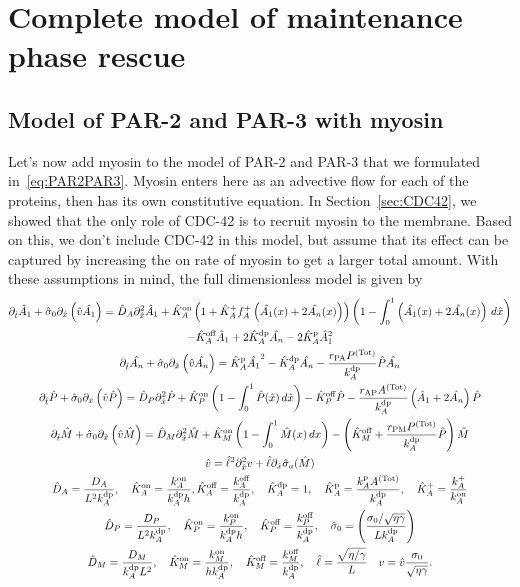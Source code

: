 \documentclass[11pt]{article}
\newcommand{\6}[1]{#1_{\text{6}}}
\newcommand{\3}[1]{#1_{\text{3}}}
\newcommand{\Tot}[1]{#1^\text{(Tot)}}
\newcommand{\A}[1]{#1_A}
\newcommand{\My}[1]{#1_M}
\begin{document}
\section{Complete model of maintenance phase rescue}

\subsection{Model of PAR-2 and PAR-3 with myosin  \label{sec:P2P3My}}
Let's now add myosin to the model of PAR-2 and PAR-3 that we formulated in\ \eqref{eq:PAR2PAR3}. Myosin enters here as an advective flow for each of the proteins, then has its own constitutive equation. In Section\ \ref{sec:CDC42}, we showed that the only role of CDC-42 is to recruit myosin to the membrane. Based on this, we don't include CDC-42 in this model, but assume that its effect can be captured by increasing the on rate of myosin to get a larger total amount. With these assumptions in mind, the full dimensionless model is given by
\begin{subequations}
\label{eq:PAR2PAR3My}
\begin{gather}
\nonumber
\Dthat \hat{A}_1 +\hat{\sigma}_0  \Dxhat \left(\hat{v} \hat{\MA} \right)   =\DhatA \Dxhat^2 \hat{A}_1 +\KhatonA\left(1+\hat{K}_A^+ f_A^+\left(\hat{\MA}(x) + 2\hat{\PA}(x)\right)\right)\left(1 - \int_0^1 \left(\hat{\MA}(x) + 2\hat{\PA}(x)\right) \, d\hat{x} \right) \\  
 -\KhatoffA \hat{A}_1 +2\KhatdpA \hat{\PA}-2 \KhatpA \hat{A}_1^2 \\ 
\Dthat \hat{\PA} +\hat{\sigma}_0  \Dxhat \left(\hat{v} \hat{\PA} \right)  =\KhatpA \hat{\MA}^2- \KhatdpA \hat{\PA}-\frac{r_\text{PA} \Tot{P}}{\kdp_A}\hat{P}\hat{\PA} \\ 
\Dthat \hat{P} +\hat{\sigma}_0  \Dxhat \left(\hat{v} \hat{P} \right)  =\DhatP \Dxhat^2 \hat{P}+\KhatonP \left(1 - \int_0^1 \hat{P}(\hat x) \, d\hat{x} \right)  - \KhatoffP \hat{P}-\frac{r_\text{AP} \Tot{A}}{\kdp_A}\left(\hat A_1 + 2\hat \PA\right)\hat{P} \\ 
\Dthat \hat{M} +\hat{\sigma}_0  \Dxhat \left(\hat{v} \hat{M} \right) =\hat{D}_M \Dxhat^2 \hat{M} +\KhatonM \left(1-\int_0^1  \hat{M}(x) \, dx\right)- \left(\KhatoffM+\frac{r_\text{PM}\Tot{P}}{\kdp_A}\hat{P} \right) \hat{M}\\
\hat{v} = \hat{\ell}^2 \Dxhat^2 v +\hat{\ell} \Dxhat \hat{\sigma}_a(\hat{M})\\ \nonumber
\DhatA =\frac{\A{D}}{L^2 \A{\kdp}}, \quad \KhatonA =\frac{\A{\kon}}{\A{\kdp} h }, \KhatoffA = \frac{\koff_A}{\kdp_A}, \quad \KhatdpA =1, \quad \KhatpA = \frac{\A{\kp} \Tot{A}}{\A{\kdp}}, \quad \KhatfA = \frac{\A{\kf}}{\A{\kon}} \\
\DhatP =\frac{D_P}{L^2 \A{\kdp}}, \quad \KhatonP =\frac{{\kon_P}}{\A{\kdp} h }, \quad \KhatoffP = \frac{\koff_P}{\kdp_A}, \quad \hat{\sigma}_0 = \left(\frac{\sigma_0/ \sqrt{\eta \gamma} }{L {\kdp_A}}\right)   \\ \nonumber
 \hat{D}_M =\frac{D_M}{{\kdp_A}  L^2}, \quad \KhatonM= \frac{\My{\kon}}{h {\kdp_A}}, \quad \KhatoffM = \frac{\koff_M}{\kdp_A}, \quad  \hat{\ell} = \frac{\sqrt{\eta/\gamma}}{L} \quad v = \hat{v} \frac{\sigma_0}{\sqrt{\eta \gamma}}.
\end{gather}
\end{subequations}
\end{document}
